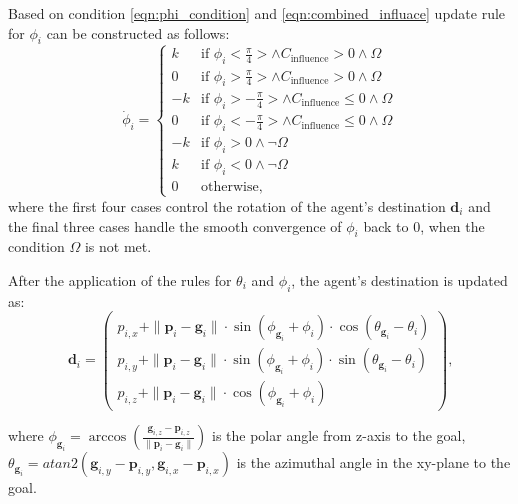         Based on condition \eqref{eqn:phi_condition} and \eqref{eqn:combined_influace} update rule for $\phi_i$ can be constructed as follows:
        \begin{equation}
            \label{eqn:phi_update}
            \dot{\phi}_i = 
            \begin{cases}
                k  & \text{if } \phi_i < \frac{\pi}{4} > \land C_{\text{influence}} > 0 \land \Omega \\
                0  & \text{if } \phi_i > \frac{\pi}{4} > \land C_{\text{influence}} > 0 \land \Omega \\
                -k & \text{if } \phi_i > -\frac{\pi}{4} > \land C_{\text{influence}} \leq 0 \land \Omega \\
                0  & \text{if } \phi_i < -\frac{\pi}{4} > \land C_{\text{influence}} \leq 0 \land \Omega \\
                -k & \text{if } \phi_i > 0 \land \neg \Omega \\
                k  & \text{if } \phi_i < 0 \land \neg \Omega \\
                0  & \text{otherwise}\text{,}
            \end{cases}
        \end{equation}
        where the first four cases control the rotation of the agent's destination $\mathbf{d}_i$ and the final three cases handle the smooth convergence of $\phi_i$ back to 0, when the condition $\Omega$ is not met. 

        After the application of the rules for $\theta_i$ and $\phi_i$, the agent's destination is updated as:
        \begin{equation}
            \label{eqn:destination_update}
            \mathbf{d}_i =
            \begin{pmatrix}
                p_{i,x} +  \|\mathbf{p}_i - \mathbf{g}_i\| \cdot \sin(\phi_{\mathbf{g}_i} + \phi_i) \cdot \cos(\theta_{\mathbf{g}_i} - \theta_i) \\
                p_{i,y} + \|\mathbf{p}_i - \mathbf{g}_i\| \cdot \sin(\phi_{\mathbf{g}_i} + \phi_i) \cdot \sin(\theta_{\mathbf{g}_i} - \theta_i) \\
                p_{i,z} + \|\mathbf{p}_i - \mathbf{g}_i\| \cdot \cos(\phi_{\mathbf{g}_i} + \phi_i)
            \end{pmatrix}\text{,}
        \end{equation}

        where $\phi_{\mathbf{g}_i} = \arccos(\frac{\mathbf{g}_{i,z} - \mathbf{p}_{i,z}}{\|\mathbf{p}_i - \mathbf{g}_i\|})$ is the polar angle from z-axis to the goal, 
        $\theta_{\mathbf{g}_i} = atan2( \mathbf{g}_{i,y} - \mathbf{p}_{i,y}, \mathbf{g}_{i,x} - \mathbf{p}_{i,x})$ is the azimuthal angle in the xy-plane to the goal.
    
